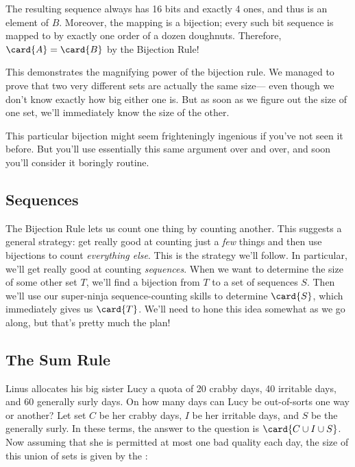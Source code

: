 The resulting sequence always has 16 bits and exactly 4
ones, and thus is an element of $B$.  Moreover, the mapping is a
bijection; every such bit sequence is mapped to by exactly one order
of a dozen doughnuts.  Therefore, $\card{A} = \card{B}$ by the
Bijection Rule!

This demonstrates the magnifying power of the bijection rule.  We
managed to prove that two very different sets are actually the same
size--- even though we don't know exactly how big either one is.  But
as soon as we figure out the size of one set, we'll immediately know
the size of the other.

This particular bijection might seem frighteningly ingenious if you've
not seen it before.  But you'll use essentially this same argument
over and over, and soon you'll consider it boringly routine.

\subsection{Sequences}

The Bijection Rule lets us count one thing by counting another.  This
suggests a general strategy: get really good at counting just a
\textit{few} things and then use bijections to count \textit{everything
else}.  This is the strategy we'll follow.  In particular, we'll get
really good at counting \emph{sequences}.  When we want to determine the
size of some other set $T$, we'll find a bijection from $T$ to a set of
sequences $S$.  Then we'll use our super-ninja sequence-counting skills to
determine $\card{S}$, which immediately gives us $\card{T}$.  We'll need
to hone this idea somewhat as we go along, but that's pretty much the
plan!



\subsection{The Sum Rule}

Linus allocates his big sister Lucy a quota of 20 crabby days, 40
irritable days, and 60 generally surly days.  On how many days can
Lucy be out-of-sorts one way or another?  Let set $C$ be her crabby
days, $I$ be her irritable days, and $S$ be the generally surly.  In
these terms, the answer to the question is $\card{C \cup I \cup S}$.
Now assuming that she is permitted at most one bad quality each day,
the size of this union of sets is given by the :

